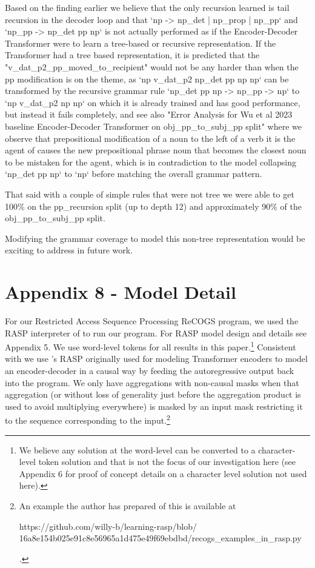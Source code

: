 \documentclass[11pt]{article}
\begin{document}
Based on the finding earlier we believe that the only recursion learned is tail recursion in the decoder loop and that `np -> np\_det | np\_prop | np\_pp` and `np\_pp -> np\_det pp np` is not actually performed as if the Encoder-Decoder Transformer were to learn a tree-based or recursive representation. If the Transformer had a tree based representation, it is predicted that the "v\_dat\_p2\_pp\_moved\_to\_recipient" would not be any harder than when the pp modification is on the theme, as `np v\_dat\_p2 np\_det pp np np` can be transformed by the recursive grammar rule `np\_det pp np -> np\_pp -> np` to `np v\_dat\_p2 np np` on which it is already trained and has good performance, but instead it fails completely, and see also "Error Analysis for Wu et al 2023 baseline Encoder-Decoder Transformer on obj\_pp\_to\_subj\_pp split" where we observe that prepositional modification of a noun to the left of a verb it is the agent of causes the new prepositional phrase noun that becomes the closest noun to be mistaken for the agent, which is in contradiction to the model collapsing `np\_det pp np` to `np` before matching the overall grammar pattern.

That said with a couple of simple rules that were not tree we were able to get 100\% on the pp\_recursion split (up to depth 12) and approximately 90\% of the obj\_pp\_to\_subj\_pp split.

Modifying the grammar coverage to model this non-tree representation would be exciting to address in future work.

\section{Appendix 8 - Model Detail}

For our Restricted Access Sequence Processing ReCOGS program, we used the RASP interpreter of \cite{Weiss2021} to run our program. For RASP model design and details see Appendix 5. We use word-level tokens for all results in this paper.\footnote{We believe any solution at the word-level can be converted to a character-level token solution and that is not the focus of our investigation here (see Appendix 6 for proof of concept details on a character level solution not used here).}
Consistent with \cite{Zhou2024} we use \cite{Weiss2021}'s RASP originally used for modeling Transformer encoders to model an encoder-decoder in a causal way by feeding the autoregressive output back into the program. We only have aggregations with non-causal masks when that aggregation (or without loss of generality just before the aggregation product is used to avoid multiplying everywhere) is masked by an input mask restricting it to the sequence corresponding to the input.\footnote{An example the author has prepared of this is available at 
\begin{tiny}
https://github.com/willy-b/learning-rasp/blob/
16a8e154b025e91c8e56965a1d475e49f69ebdbd/recogs\_examples\_in\_rasp.py 
\end{tiny}
.}
\end{document}
